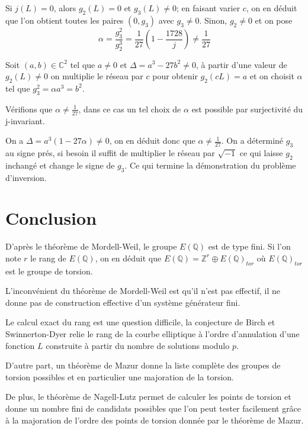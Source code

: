 \documentclass{article}
\begin{document}
Si $j(L) = 0$, alors $g_{2}(L) = 0$ et $g_{3}(L) \neq 0$; en faisant varier $c$, on en déduit que l'on obtient toutes
les paires $(0, g_{3})$ avec $g_{3} \neq 0$. Sinon, $g_{2} \neq 0$ et on pose
\begin{equation*}
\alpha = \frac{g_{3}^2}{g_{2}^3} = \frac{1}{27}(1-\frac{1728}{j}) \neq \frac{1}{27}
\end{equation*}

Soit $(a,b)\in \mathbb{C}^2$ tel que $a \neq 0$ et $\Delta = a^3 - 27b^2 \neq 0$, 
à partir d'une valeur de $g_{2}(L) \neq 0$ on multiplie le réseau par $c$ pour obtenir $g_{2}(cL)=a$
et on choisit $\alpha$ tel que $g_{3}^2 = \alpha a^3 = b^2$.

Vérifions que $\alpha \neq \frac{1}{27}$, dans ce cas
un tel choix de $\alpha$ est possible par surjectivité du j-invariant.

On a $\Delta = a^3(1 - 27\alpha) \neq 0$,
on en déduit donc que $\alpha \neq \frac{1}{27}$. On a déterminé $g_{3}$ au signe prés, si besoin il suffit
de multiplier le réseau par $\sqrt{-1}$ ce qui laisse $g_{2}$ inchangé et change le signe de $g_{3}$. Ce qui
termine la démonstration du problème d'inversion.

\section{Conclusion}
D'après le théorème de Mordell-Weil, le groupe $E(\mathbb{Q})$ est de type fini. Si l'on note $r$ le rang de
$E(\mathbb{Q})$, on en déduit que $E(\mathbb{Q})=\mathbb{Z}^r \oplus E(\mathbb{Q})_{tor}$ où $E(\mathbb{Q})_{tor}$
est le groupe de torsion.

L'inconvénient du théorème de Mordell-Weil est qu'il n'est pas effectif, il ne donne pas
de construction effective d'un système générateur fini.

Le calcul exact du rang est une question difficile, la conjecture
de Birch et Swinnerton-Dyer relie le rang de la courbe elliptique à l'ordre d'annulation d'une fonction $L$
construite à partir du nombre de solutions modulo $p$.

D'autre part, un théorème de Mazur donne la
liste complète des groupes de torsion possibles et en particulier une majoration de la torsion.

De plus, le théorème de Nagell-Lutz permet de calculer les points de torsion et donne un nombre fini de candidats possibles que l'on peut tester facilement grâce à la majoration de l'ordre des points de torsion donnée par le théorème de Mazur.



\end{document}
